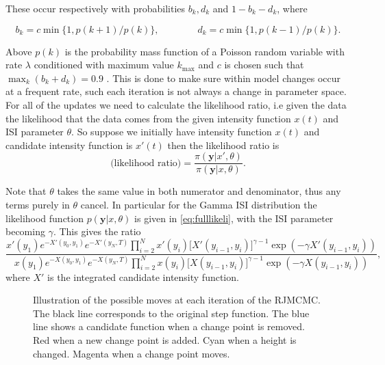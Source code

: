 \documentclass[../main.tex]{subfiles}
\begin{document}
\noindent These occur respectively with probabilities $b_k, d_k$ and $ 1- b_k - d_k$, where

\begin{equation}
b_k = c \min\{1,p(k+1)/p(k) \}, \qquad \qquad d_k = c \min \{ 1, p(k-1)/p(k) \}.
\end{equation}

Above $p(k)$ is the probability mass function of a Poisson random variable with rate $\lambda$ conditioned with maximum value $k_{\mathrm{max}}$ and $c$ is chosen such that $\max_k (b_k +d_k ) = 0.9$ \cite{RJMCMC}. This is done to make sure within model changes occur at a frequent rate, such each iteration is not always a change in parameter space.\\

For all of the updates we need to calculate the likelihood ratio, i.e given the data the likelihood that the data comes from the given intensity function $x(t)$ and ISI parameter $\theta$. So suppose we initially have intensity function $x(t)$ and candidate intensity function is $x'(t)$ then 
the likelihood ratio is
\begin{equation}
\text{(likelihood ratio)} = \frac{\pi (\mathbf{y} | x', \theta)}{\pi (\mathbf{y} | x, \theta)}.
\end{equation}

Note that $\theta$ takes the same value in both numerator and denominator, thus any terms purely in $\theta$ cancel. In particular for the Gamma ISI distribution the likelihood function $p(\mathbf{y} | x, \theta)$ is given in \eqref{eq:fulllikeli}, with the ISI parameter becoming $\gamma$. This gives the ratio
\begin{equation}
 \frac{x'(y_1) e^{-X'(y_0,y_1)} e^{-X'(y_N,T)} \prod^N_{i=2}  x'(y_i) \big[ X'(y_{i-1} , y_i ) \big]^{\gamma -1} \exp( - \gamma X'(y_{i-1} , y_i )  )}
{x(y_1) e^{-X(y_0,y_1)} e^{-X(y_N,T)} \prod^N_{i=2}  x(y_i) \big[ X(y_{i-1} , y_i ) \big]^{\gamma -1} \exp( - \gamma X(y_{i-1} , y_i )  )},
\end{equation}
where $X'$ is the integrated candidate intensity function.\\

  \begin{figure}[t]
   \hrulefill
   \begin{center} 
    \end{center}     
    \caption{Illustration of the possible moves at each iteration of the RJMCMC. The black line corresponds to the original step function. The blue line shows a candidate function when a change point is removed. Red when a new change point is added. Cyan when a height is changed. Magenta when a change point moves.  }
    \label{fig:PWCMove}
    \hrulefill
    \end{figure}
\end{document}

